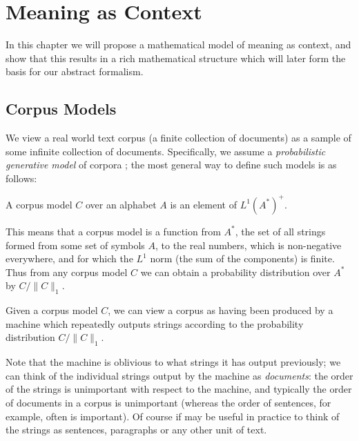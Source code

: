 \documentclass[11pt]{report}
\begin{document}
\chapter{Meaning as Context}


In this chapter we will propose a mathematical model of meaning as context, and show that this results in a rich mathematical structure which will later form the basis for our abstract formalism.

\section{Corpus Models}






 We view a real world text corpus (a finite collection of documents) as a sample of some infinite collection of documents. Specifically, we assume a \emph{probabilistic generative model} of corpora \citep{Blei:03}; the most general way to define such models is as follows:
\begin{defn}
A corpus model $C$ over an alphabet $A$ is an element of $L^1(A^*)^+$. 
\end{defn}\noindent
This means that a corpus model is a function from $A^*$, the set of all strings formed from some set of symbols $A$, to the real numbers, which is non-negative everywhere, and for which the $L^1$ norm (the sum of the components) is finite. Thus from any corpus model $C$ we can obtain a probability distribution over $A^*$ by $C/\|C\|_1$.

Given a corpus model $C$, we can view a corpus as having been produced by a machine which repeatedly outputs strings according to the probability distribution $C/\|C\|_1$.

Note that the machine is oblivious to what strings it has output previously; we can think of the individual strings output by the machine as \emph{documents}: the order of the strings is unimportant with respect to the machine, and typically the order of documents in a corpus is unimportant (whereas the order of sentences, for example, often is important). Of course if may be useful in practice to think of the strings as sentences, paragraphs or any other unit of text.
 
\end{document}
